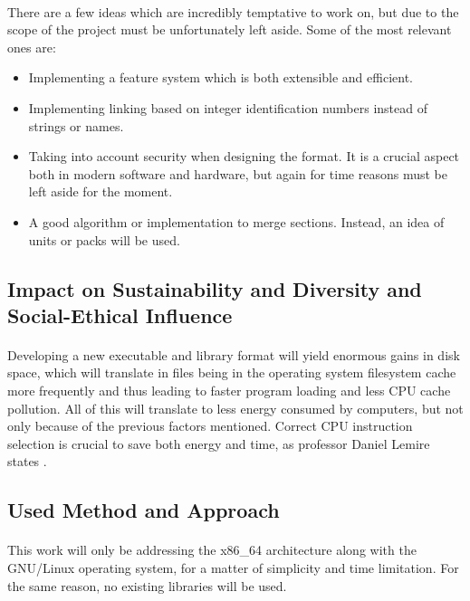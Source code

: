 \documentclass[12pt]{article}
\begin{document}
	\paragraph{}There are a few ideas which are incredibly temptative to work on, but due to the scope of the project must be unfortunately left aside. Some of the most relevant ones are:
	\begin{itemize}
		\item Implementing a feature system which is both extensible and efficient.
		\item Implementing linking based on integer identification numbers instead of strings or names.
		\item Taking into account security when designing the format. It is a crucial aspect both in modern software and hardware, but again for time reasons must be left aside for the moment.
		\item A good algorithm or implementation to merge sections. Instead, an idea of units or packs will be used.
	\end{itemize}

	\subsection{Impact on Sustainability and Diversity and Social-Ethical Influence}
    \paragraph{} Developing a new executable and library format will yield enormous gains in disk space, which will translate in files being in the operating system filesystem cache more frequently and thus leading to faster program loading and less CPU cache pollution. All of this will translate to less energy consumed by computers, but not only because of the previous factors mentioned. Correct CPU instruction selection is crucial to save both energy and time, as professor Daniel Lemire states \cite{lemire-energy}. 
	\subsection{Used Method and Approach}
	\paragraph{}This work will only be addressing the x86\_64 architecture along with the GNU/Linux operating system, for a matter of simplicity and time limitation. For the same reason, no existing libraries will be used.
    
\end{document}
